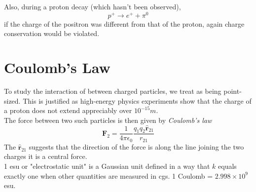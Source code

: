 \documentclass{article}
\begin{document}
	Also, during a proton decay (which hasn't been observed),
		$$ p^+ \rightarrow e^+ + \pi^0 $$
	if the charge of the positron was different from that of the proton, again charge conservation would be violated.
	
	\section*{Coulomb's Law}
	To study the interaction of between charged  particles, we treat as being point-sized. This is justified as high-energy physics experiments show that the charge of a proton does not extend appreciably over $10^{-15} m$.\\
	
	The force between two such particles is then given by \textit{Coulomb's law}
	\begin{equation}\textbf{F}_2 = \frac{1}{4\pi\epsilon_0}\frac{q_1q_2\hat{\textbf{r}}_{21}}{r_{21}}
	\end{equation}
	The $\hat{\textbf{r}}_{21}$ suggests that the direction of the force is along the line joining the two charges \textemdash it is a central force.\\
	
	1 esu or "electrostatic unit" is a Gaussian unit defined in a way that $k$ equals exactly one when  other quantities are measured in cgs. 1 Coulomb = $2.998 \times 10^9$ esu.
	
\end{document}
